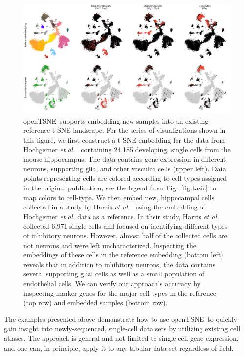 \documentclass[twocolumn]{bmcart}
\newcommand{\opentsne}{\textsf{openTSNE}}
\begin{document}
\begin{figure}[htbp]
  \includegraphics[width=\textwidth]{transform_hochgerner}
  \caption{\label{fig:transform}
  \opentsne\ supports embedding new samples into an existing reference t-SNE
  landscape. For the series of visualizations shown in this figure, we
  first construct a t-SNE embedding for the data from Hochgerner
  \textit{et al.}~\cite{hochgerner2018conserved} containing 24,185
  developing, single cells from the mouse hippocampus. The data contains
  gene expression in different neurons, supporting glia, and other
  vascular cells (upper left). Data points representing cells are colored
  according to cell-types assigned in the original publication; see the
  legend from Fig.~\ref{fig:tasic} to map colors to cell-type. We then
  embed new, hippocampal cells collected in a study by Harris \textit{et
  al.}~\cite{harris2018classes} using the embedding of Hochgerner
  \textit{et al.} data as a reference. In their study, Harris \textit{et
  al.} collected 6,971 single-cells and focused on identifying different
  types of inhibitory neurons. However, almost half of the collected cells
  are not neurons and were left uncharacterized. Inspecting the embeddings
  of these cells in the reference embedding (bottom left) reveals that in
  addition to inhibitory neurons, the data contains several supporting
  glial cells as well as a small population of endothelial cells. We can
  verify our approach's accuracy by inspecting marker genes for the major
  cell types in the reference (top row) and embedded samples (bottom row).
}
\end{figure}

The examples presented above demonstrate how to use \opentsne\ to quickly gain
insight into newly-sequenced, single-cell data sets by utilizing existing cell
atlases. The approach is general and not limited to single-cell gene expression,
and one can, in principle, apply it to any tabular data set regardless of field.
\end{document}
